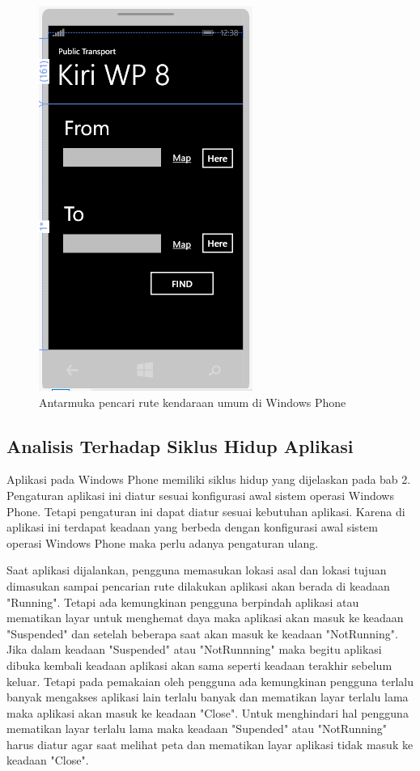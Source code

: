 \begin{figure}[h]
	\centering
		\includegraphics[scale=0.6]{Gambar/kontrol/control.PNG}
	\caption{Antarmuka pencari rute kendaraan umum di Windows Phone}
	\label{fig:antarmuka}
\end{figure}

\newpage
\subsection{Analisis Terhadap Siklus Hidup Aplikasi}
\label{lab:Analisis Terhadap Siklus Hidup Aplikasi}
\hspace{0.5cm} Aplikasi pada Windows Phone memiliki siklus hidup yang dijelaskan pada bab 2. Pengaturan aplikasi ini diatur sesuai konfigurasi awal sistem operasi Windows Phone. Tetapi pengaturan ini dapat diatur sesuai kebutuhan aplikasi. Karena di aplikasi ini terdapat keadaan yang berbeda dengan konfigurasi awal sistem operasi Windows Phone maka perlu adanya pengaturan ulang.

\hspace{0.5cm} Saat aplikasi dijalankan, pengguna memasukan lokasi asal dan lokasi tujuan dimasukan sampai pencarian rute dilakukan aplikasi akan berada di keadaan "Running". Tetapi ada kemungkinan pengguna berpindah aplikasi atau mematikan layar untuk menghemat daya maka aplikasi akan masuk ke keadaan "Suspended" dan setelah beberapa saat akan masuk ke keadaan "NotRunning". Jika dalam keadaan "Suspended" atau "NotRunnning" maka begitu aplikasi dibuka kembali keadaan aplikasi akan sama seperti keadaan terakhir sebelum keluar. Tetapi pada pemakaian oleh pengguna ada kemungkinan pengguna terlalu banyak mengakses aplikasi lain terlalu banyak dan mematikan layar terlalu lama maka aplikasi akan masuk ke keadaan "Close". Untuk menghindari hal pengguna mematikan layar terlalu lama maka keadaan "Supended" atau "NotRunning" harus diatur agar saat melihat peta dan mematikan layar aplikasi tidak masuk ke keadaan "Close". 

